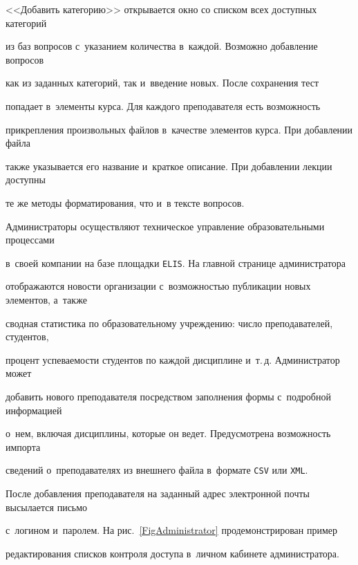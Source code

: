 <<Добавить категорию>> открывается окно со списком всех доступных категорий 


из баз вопросов с~указанием количества в~каждой. Возможно добавление вопросов 


как из заданных категорий, так и~введение новых. После сохранения тест 


попадает в~элементы курса. Для каждого преподавателя есть возможность 


прикрепления произвольных файлов в~качестве элементов курса. При добавлении файла 


также указывается его название и~краткое описание. При добавлении лекции доступны 


те же методы форматирования, что и~в тексте вопросов.











Администраторы осуществляют техническое управление образовательными процессами 


в~своей компании на базе площадки \verb"ELIS". На главной странице администратора 


отображаются новости организации с~возможностью публикации новых элементов, а~также 


сводная статистика по образовательному учреждению: число преподавателей, студентов, 


процент успеваемости студентов по каждой дисциплине и~т.\,д. Администратор может 


добавить нового преподавателя посредством заполнения формы с~подробной информацией 


о~нем, включая дисциплины, которые он ведет. Предусмотрена возможность импорта 


сведений о~преподавателях из внешнего файла в~формате \verb"CSV" или \verb"XML". 


После добавления преподавателя на заданный адрес электронной почты высылается письмо 


с~логином и~паролем. На рис.~\ref{FigAdministrator} продемонстрирован пример 


редактирования списков контроля доступа в~личном кабинете администратора.





